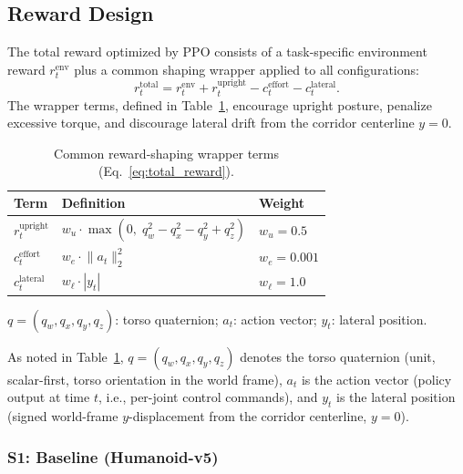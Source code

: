 \documentclass[conference]{IEEEtran}
\begin{document}
\subsection{Reward Design}
\label{sec:reward_design}
The total reward optimized by PPO consists of a task-specific environment reward $r_t^{\mathrm{env}}$ plus a common shaping wrapper applied to all configurations:
\begin{equation}
\label{eq:total_reward}
r_t^{\mathrm{total}} = r_t^{\mathrm{env}} + r_t^{\mathrm{upright}} - c_t^{\mathrm{effort}} - c_t^{\mathrm{lateral}}.
\end{equation}
The wrapper terms, defined in Table~\ref{tab:wrapper}, encourage upright posture, penalize excessive torque, and discourage lateral drift from the corridor centerline $y = 0$.
\begin{table}[h!]
\caption{Common reward-shaping wrapper terms (Eq.~\ref{eq:total_reward}).}
\label{tab:wrapper}
\centering
\small
\renewcommand{\arraystretch}{1.3}
\begin{tabular}{@{}lll@{}}
\toprule
\textbf{Term} & \textbf{Definition} & \textbf{Weight} \\
\midrule
$r_t^{\mathrm{upright}}$ & $w_u \cdot \max\!\left(0,\; q_{w}^2 - q_{x}^2 - q_{y}^2 + q_{z}^2\right)$ & $w_u = 0.5$ \\[2pt]
$c_t^{\mathrm{effort}}$ & $w_e \cdot \lVert a_t \rVert_2^2$ & $w_e = 0.001$ \\[2pt]
$c_t^{\mathrm{lateral}}$ & $w_\ell \cdot |y_t|$ & $w_\ell = 1.0$ \\
\bottomrule
\end{tabular}
\vspace{2pt}
{\raggedright\footnotesize $q = (q_w, q_x, q_y, q_z)$: torso quaternion;\; $a_t$: action vector;\; $y_t$: lateral position.\par}
\end{table}

As noted in Table~\ref{tab:wrapper}, $q=(q_w,q_x,q_y,q_z)$ denotes the torso quaternion (unit, scalar-first, torso orientation in the world frame), $a_t$ is the action vector (policy output at time $t$, i.e., per-joint control commands), and $y_t$ is the lateral position (signed world-frame $y$-displacement from the corridor centerline, $y=0$).

\subsubsection{S1: Baseline (Humanoid-v5)}
\end{document}
